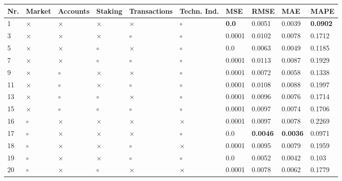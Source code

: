 \begin{table}[H]
\centering
\begin{tabular}{|P{0.7cm}|P{1.3cm}P{1.3cm}P{1.3cm}P{1.3cm}P{1.3cm}|P{1.1cm}P{1.1cm}P{1.1cm}P{1.1cm}|}
\hline
 Nr. &   Market & Accounts &  Staking & Transactions & Techn. Ind. &          MSE &            RMSE &             MAE &            MAPE \\
 & $\times$ & $\times$ & $\times$ &     $\times$ &     $\circ$ & \textbf{0.0} &          0.0051 &          0.0039 & \textbf{0.0902} \\
   3 & $\times$ & $\times$ & $\times$ &      $\circ$ &     $\circ$ &       0.0001 &          0.0102 &          0.0078 &          0.1712 \\
   5 & $\times$ & $\times$ &  $\circ$ &     $\times$ &     $\circ$ &          0.0 &          0.0063 &          0.0049 &          0.1185 \\
   7 & $\times$ & $\times$ &  $\circ$ &      $\circ$ &     $\circ$ &       0.0001 &          0.0113 &          0.0087 &          0.1929 \\
   9 & $\times$ &  $\circ$ & $\times$ &     $\times$ &     $\circ$ &       0.0001 &          0.0072 &          0.0058 &          0.1338 \\
  11 & $\times$ &  $\circ$ & $\times$ &      $\circ$ &     $\circ$ &       0.0001 &          0.0108 &          0.0088 &          0.1997 \\
  13 & $\times$ &  $\circ$ &  $\circ$ &     $\times$ &     $\circ$ &       0.0001 &          0.0096 &          0.0076 &          0.1714 \\
  15 & $\times$ &  $\circ$ &  $\circ$ &      $\circ$ &     $\circ$ &       0.0001 &          0.0097 &          0.0074 &          0.1706 \\
  16 &  $\circ$ & $\times$ & $\times$ &     $\times$ &    $\times$ &       0.0001 &          0.0097 &          0.0078 &          0.2269 \\
  17 &  $\circ$ & $\times$ & $\times$ &     $\times$ &     $\circ$ &          0.0 & \textbf{0.0046} & \textbf{0.0036} &          0.0971 \\
  18 &  $\circ$ & $\times$ & $\times$ &      $\circ$ &    $\times$ &       0.0001 &          0.0095 &          0.0079 &          0.1959 \\
  19 &  $\circ$ & $\times$ & $\times$ &      $\circ$ &     $\circ$ &          0.0 &          0.0052 &          0.0042 &           0.103 \\
  20 &  $\circ$ & $\times$ &  $\circ$ &     $\times$ &    $\times$ &       0.0001 &          0.0078 &          0.0062 &          0.1779 \\

\end{tabular}
\end{table}
